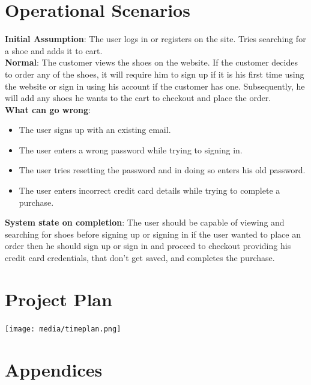 \documentclass[12pt]{article}
\begin{document}




\section{Operational Scenarios}
\textbf{Initial Assumption}: The user logs in or registers on the site. Tries searching for a shoe and adds it to cart.\\
\textbf{Normal}: The customer views the shoes on the website. If the customer decides to order any of the shoes, it will require him to sign up if it is his first time using the website or sign in using his account if the customer has one. Subsequently, he will add any shoes he wants to the cart to
checkout and place the order.\\
\textbf{What can go wrong}:
\begin{itemize}
\item The user signs up with an existing email.
\item The user enters a wrong password while trying to signing in.
\item The user tries resetting the password and in doing so enters his old password.
\item The user enters incorrect credit card details while trying to complete a purchase.
\end{itemize}
\textbf{System state on completion}: The user should be capable of viewing and searching for shoes before signing up or signing in if the user wanted to place an order then he should sign up or sign in and proceed to checkout providing his credit card credentials, that don't get saved, and completes the purchase.
\section{Project Plan}
\texttt{[image: media/timeplan.png]}

\section{Appendices}
\end{document}
